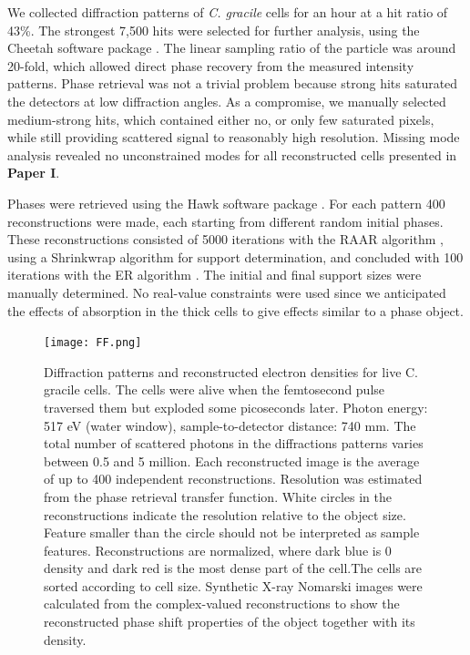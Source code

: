 We collected diffraction patterns of \textit{C. gracile} cells for an hour at a hit ratio of 43\%. The strongest 7,500 hits were selected for further analysis, using the Cheetah software package \cite{Barty2014}. The linear sampling ratio of the particle was around 20-fold, which allowed direct phase recovery from the measured intensity patterns. Phase retrieval was not a trivial problem because strong hits saturated the detectors at low diffraction angles. As a compromise, we manually selected medium-strong hits, which contained either no, or only few saturated pixels, while still providing scattered signal to reasonably high resolution. Missing mode analysis revealed no unconstrained modes for all reconstructed cells presented in \textbf{Paper I}. 

Phases were retrieved using the Hawk software package \cite{Maia2010}. For each pattern 400 reconstructions were made, each starting from different random initial phases. These reconstructions consisted of 5000 iterations with the RAAR algorithm \cite{Luke2005}, using a Shrinkwrap algorithm \cite{Marchesini2003} for support determination, and concluded with 100 iterations with the ER algorithm \cite{Fienup1978, Fienup1982}. The initial and final support sizes were manually determined. No real-value constraints were used since we anticipated the effects of absorption in the thick cells to give effects similar to a phase object. 

\begin{figure}[!ht]
	\centering 
		\texttt{[image: FF.png]}
	\caption{Diffraction patterns and reconstructed electron densities for live C. gracile cells. The cells were alive when the femtosecond pulse traversed them but exploded some picoseconds later. Photon energy: 517 eV (water window), sample-to-detector distance: 740 mm. The total number of scattered photons in the diffractions patterns varies between 0.5 and 5 million. Each reconstructed image is the average of up to 400 independent reconstructions. Resolution was estimated from the phase retrieval transfer function. White circles in the reconstructions indicate the resolution relative to the object size. Feature smaller than the circle should not be interpreted as sample features. Reconstructions are normalized, where dark blue is 0 density and dark red is the most dense part of the cell.The cells are sorted according to cell size. Synthetic X-ray Nomarski images were calculated from the complex-valued reconstructions to show the reconstructed phase shift properties of the object together with its density.}\label{fig:Reconstructions}
\end{figure}

